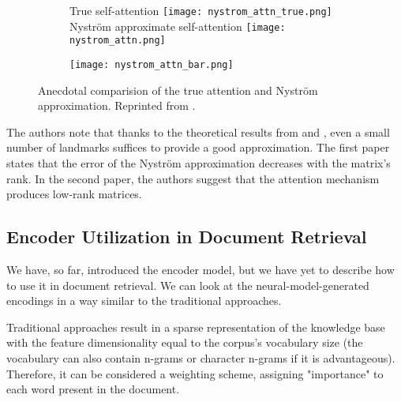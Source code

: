 \begin{figure}[!htb]
        \centering
        \hspace{.5cm}
        \begin{subfigure}{.7\textwidth}
                \begin{minipage}[c]{0.8\linewidth}
                \centering True self-attention
                \texttt{[image: nystrom\_attn\_true.png]}
                \centering Nystr\"{o}m approximate self-attention
                \texttt{[image: nystrom\_attn.png]}
        \end{minipage}
                \hfill
        \begin{minipage}[c]{0.12\linewidth}
                \centering 
                \texttt{[image: nystrom\_attn\_bar.png]}
        \end{minipage}
        \end{subfigure}
        \caption[\nystr{} Attention Example]{Anecdotal comparision of the true attention and Nystr\"om approximation. Reprinted from \citep{nystrom}.}
        \label{fig:nystrom_example}
\end{figure}

The authors note that thanks to the theoretical results from \citep{nystr-2017} and \citep{linformer}, even a small number of landmarks suffices to provide a good approximation.
The first paper states that the error of the Nystr\"om approximation decreases with the matrix's rank.
In the second paper, the authors suggest that the attention mechanism produces low-rank matrices.  

\subsection{Encoder Utilization in Document Retrieval}

We have, so far, introduced the encoder model, but we have yet to describe how to use it in document retrieval. We can look at the neural-model-generated encodings in a way similar to the traditional approaches.

Traditional approaches result in a sparse representation of the knowledge base with the feature dimensionality equal to the corpus's vocabulary size (the vocabulary can also contain n-grams or character n-grams if it is advantageous).
Therefore, it can be considered a weighting scheme, assigning "importance" to each word present in the document. 

